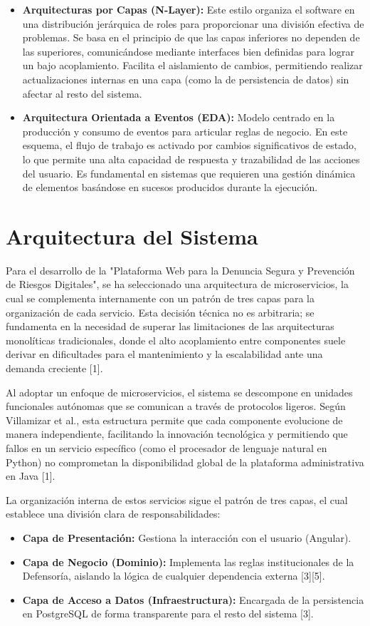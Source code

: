 \begin{itemize}
    \item \textbf{Arquitecturas por Capas (N-Layer):} Este estilo organiza el software en una distribución jerárquica de roles para proporcionar una división efectiva de problemas. Se basa en el principio de que las capas inferiores no dependen de las superiores, comunicándose mediante interfaces bien definidas para lograr un bajo acoplamiento. Facilita el aislamiento de cambios, permitiendo realizar actualizaciones internas en una capa (como la de persistencia de datos) sin afectar al resto del sistema.

    \item \textbf{Arquitectura Orientada a Eventos (EDA):} Modelo centrado en la producción y consumo de eventos para articular reglas de negocio. En este esquema, el flujo de trabajo es activado por cambios significativos de estado, lo que permite una alta capacidad de respuesta y trazabilidad de las acciones del usuario. Es fundamental en sistemas que requieren una gestión dinámica de elementos basándose en sucesos producidos durante la ejecución.
\end{itemize}


\section{Arquitectura del Sistema}

Para el desarrollo de la "Plataforma Web para la Denuncia Segura y Prevención de Riesgos Digitales", se ha seleccionado una arquitectura de microservicios, la cual se complementa internamente con un patrón de tres capas para la organización de cada servicio. Esta decisión técnica no es arbitraria; se fundamenta en la necesidad de superar las limitaciones de las arquitecturas monolíticas tradicionales, donde el alto acoplamiento entre componentes suele derivar en dificultades para el mantenimiento y la escalabilidad ante una demanda creciente [1].

Al adoptar un enfoque de microservicios, el sistema se descompone en unidades funcionales autónomas que se comunican a través de protocolos ligeros. Según Villamizar et al., esta estructura permite que cada componente evolucione de manera independiente, facilitando la innovación tecnológica y permitiendo que fallos en un servicio específico (como el procesador de lenguaje natural en Python) no comprometan la disponibilidad global de la plataforma administrativa en Java [1].

La organización interna de estos servicios sigue el patrón de tres capas, el cual establece una división clara de responsabilidades:
\begin{itemize}
    \item \textbf{Capa de Presentación:} Gestiona la interacción con el usuario (Angular).
    \item \textbf{Capa de Negocio (Dominio):} Implementa las reglas institucionales de la Defensoría, aislando la lógica de cualquier dependencia externa [3][5].
    \item \textbf{Capa de Acceso a Datos (Infraestructura):} Encargada de la persistencia en PostgreSQL de forma transparente para el resto del sistema [3].
\end{itemize}

